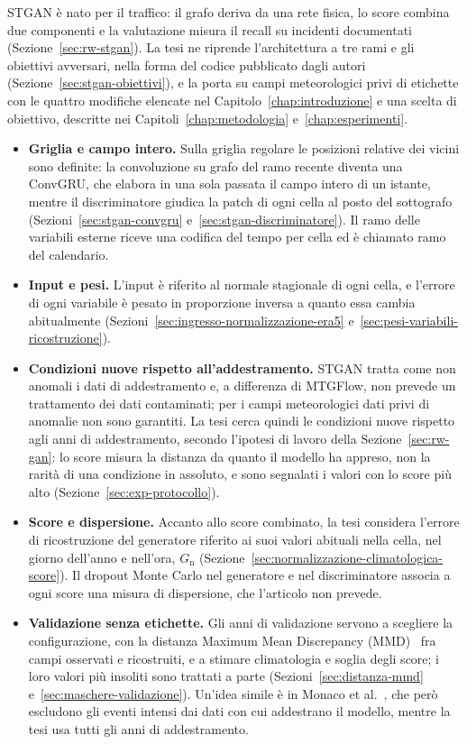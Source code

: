 STGAN è nato per il traffico: il grafo deriva da una rete fisica, lo score combina due componenti e la valutazione misura il recall su incidenti documentati (Sezione~\ref{sec:rw-stgan}). La tesi ne riprende l'architettura a tre rami e gli obiettivi avversari, nella forma del codice pubblicato dagli autori (Sezione~\ref{sec:stgan-obiettivi}), e la porta su campi meteorologici privi di etichette con le quattro modifiche elencate nel Capitolo~\ref{chap:introduzione} e una scelta di obiettivo, descritte nei Capitoli~\ref{chap:metodologia} e~\ref{chap:esperimenti}.
\begin{itemize}
    \item \textbf{Griglia e campo intero.} Sulla griglia regolare le posizioni relative dei vicini sono definite: la convoluzione su grafo del ramo recente diventa una ConvGRU, che elabora in una sola passata il campo intero di un istante, mentre il discriminatore giudica la patch di ogni cella al posto del sottografo (Sezioni~\ref{sec:stgan-convgru} e~\ref{sec:stgan-discriminatore}). Il ramo delle variabili esterne riceve una codifica del tempo per cella ed è chiamato ramo del calendario.
    \item \textbf{Input e pesi.} L'input è riferito al normale stagionale di ogni cella, e l'errore di ogni variabile è pesato in proporzione inversa a quanto essa cambia abitualmente (Sezioni~\ref{sec:ingresso-normalizzazione-era5} e~\ref{sec:pesi-variabili-ricostruzione}).
    \item \textbf{Condizioni nuove rispetto all'addestramento.} STGAN tratta come non anomali i dati di addestramento e, a differenza di MTGFlow, non prevede un trattamento dei dati contaminati; per i campi meteorologici dati privi di anomalie non sono garantiti. La tesi cerca quindi le condizioni nuove rispetto agli anni di addestramento, secondo l'ipotesi di lavoro della Sezione~\ref{sec:rw-gan}: lo score misura la distanza da quanto il modello ha appreso, non la rarità di una condizione in assoluto, e sono segnalati i valori con lo score più alto (Sezione~\ref{sec:exp-protocollo}).
    \item \textbf{Score e dispersione.} Accanto allo score combinato, la tesi considera l'errore di ricostruzione del generatore riferito ai suoi valori abituali nella cella, nel giorno dell'anno e nell'ora, $G_{\mathrm{n}}$ (Sezione~\ref{sec:normalizzazione-climatologica-score}). Il dropout Monte Carlo nel generatore e nel discriminatore associa a ogni score una misura di dispersione, che l'articolo non prevede.
    \item \textbf{Validazione senza etichette.} Gli anni di validazione servono a scegliere la configurazione, con la distanza Maximum Mean Discrepancy (MMD)~\cite{gretton2012mmd} fra campi osservati e ricostruiti, e a stimare climatologia e soglia degli score; i loro valori più insoliti sono trattati a parte (Sezioni~\ref{sec:distanza-mmd} e~\ref{sec:maschere-validazione}). Un'idea simile è in Monaco et al.~\cite{monaco2025sdeunet}, che però escludono gli eventi intensi dai dati con cui addestrano il modello, mentre la tesi usa tutti gli anni di addestramento.
\end{itemize}


